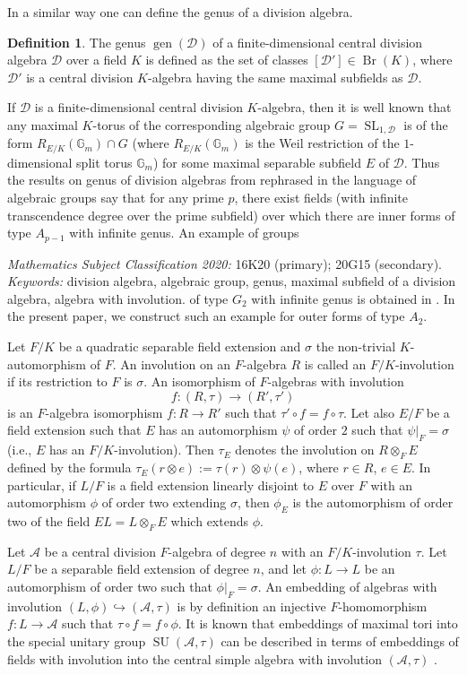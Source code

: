 \documentclass[10pt]{article}
\theoremstyle{definition}
\newtheorem{definition}[theorem]{Definition}
\DeclareMathOperator{\Br}{Br}
\DeclareMathOperator{\SU}{SU}
\DeclareMathOperator{\SL}{SL}
\DeclareMathOperator{\gen}{gen}
\newcommand{\A}{\mathcal A}
\newcommand{\D}{\mathcal D}
\newcommand{\sourcepage}[1]{\label{source-page-#1}}
\begin{document}
In a similar way one can define the genus of a division algebra.
\begin{definition}
The genus $\gen(\D)$ of a finite-dimensional central division algebra $\D$ over a field $K$ is defined as the set of classes $[\D']\in\Br(K)$, where $\D'$ is a central division $K$-algebra having the same maximal subfields as $\D$.
\end{definition}
If $\D$ is a finite-dimensional central division $K$-algebra, then it is well known that any maximal $K$-torus of the corresponding algebraic group $G=\SL_{1,\D}$ is of the form $R_{E/K}(\mathbb G_m)\cap G$ (where $R_{E/K}(\mathbb G_m)$ is the Weil restriction of the $1$-dimensional split torus $\mathbb G_m$) for some maximal separable subfield $E$ of $\D$. Thus the results on genus of division algebras from \cite{r4,r10} rephrased in the language of algebraic groups say that for any prime $p$, there exist fields (with infinite transcendence degree over the prime subfield) over which there are inner forms of type $A_{p-1}$ with infinite genus. An example of groups

\medskip\noindent\small\textit{Mathematics Subject Classification 2020:} 16K20 (primary); 20G15 (secondary).\\
\textit{Keywords:} division algebra, algebraic group, genus, maximal subfield of a division algebra, algebra with involution.\normalsize
\newpage
\sourcepage{2}
of type $G_2$ with infinite genus is obtained in \cite[Rem. 3.6 (b)]{r1}. In the present paper, we construct such an example for outer forms of type $A_2$.

Let $F/K$ be a quadratic separable field extension and $\sigma$ the non-trivial $K$-automorphism of $F$. An involution on an $F$-algebra $R$ is called an $F/K$-involution if its restriction to $F$ is $\sigma$. An isomorphism of $F$-algebras with involution
\[
f:(R,\tau)\longrightarrow(R',\tau')
\]
is an $F$-algebra isomorphism $f:R\to R'$ such that $\tau'\circ f=f\circ\tau$. Let also $E/F$ be a field extension such that $E$ has an automorphism $\psi$ of order $2$ such that $\psi|_F=\sigma$ (i.e., $E$ has an $F/K$-involution). Then $\tau_E$ denotes the involution on $R\otimes_F E$ defined by the formula $\tau_E(r\otimes e):=\tau(r)\otimes\psi(e)$, where $r\in R$, $e\in E$. In particular, if $L/F$ is a field extension linearly disjoint to $E$ over $F$ with an automorphism $\phi$ of order two extending $\sigma$, then $\phi_E$ is the automorphism of order two of the field $EL=L\otimes_F E$ which extends $\phi$.

Let $\A$ be a central division $F$-algebra of degree $n$ with an $F/K$-involution $\tau$. Let $L/F$ be a separable field extension of degree $n$, and let $\phi:L\to L$ be an automorphism of order two such that $\phi|_F=\sigma$. An embedding of algebras with involution $(L,\phi)\hookrightarrow(\A,\tau)$ is by definition an injective $F$-homomorphism $f:L\to\A$ such that $\tau\circ f=f\circ\phi$. It is known that embeddings of maximal tori into the special unitary group $\SU(\A,\tau)$ can be described in terms of embeddings of fields with involution into the central simple algebra with involution $(\A,\tau)$ \cite[Prop. 2.3]{r5}.
\end{document}
